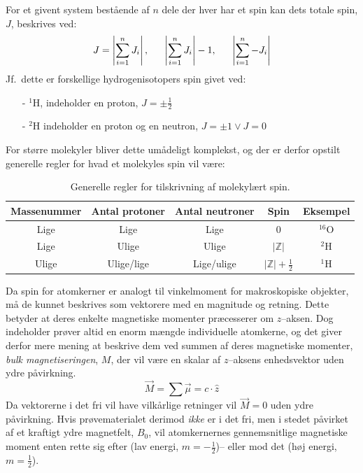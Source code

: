     For et givent system bestående af $n$ dele der hver har et spin kan dets totale spin, $J$, beskrives ved:
    \[
        J=\left|\sum_{i=1}^n J_i\right|, \hskip 16pt \left|\sum_{i=1}^n J_i\right|-1, \hskip 16pt \left|\sum_{i=1}^n -J_i\right|
    \]
    Jf.\ dette er forskellige hydrogenisotopers spin givet ved:
    \begin{itemize}
        \item[-] $^1$H, indeholder en proton, $J=\pm\frac{1}{2}$ 
        \item[-] $^2$H indeholder en proton og en neutron, $J=\pm 1 \vee J=0$ 
    \end{itemize}
    For større molekyler bliver dette umådeligt komplekst, og der er derfor opstilt generelle regler for hvad et molekyles spin vil være:
    \begin{table}[H]\centering
        \caption{Generelle regler for tilskrivning af molekylært spin.}
        \begin{tabular}{ccccc}
            \toprule
            Massenummer & Antal protoner & Antal neutroner & Spin & Eksempel \\
            \midrule
            Lige & Lige & Lige & $0$ & $^{16}$O \\
            Lige & Ulige & Ulige & $\left|\mathbb{Z}\right|$ & $^2$H \\
            Ulige & Ulige/lige & Lige/ulige &  $\left|\mathbb{Z}\right|+\frac{1}{2}$ & $^1$H \\
            \bottomrule
        \end{tabular}
    \end{table}
    Da spin for atomkerner er analogt til vinkelmoment for makroskopiske objekter, må de kunnet beskrives som vektorere med en magnitude og retning. Dette betyder at deres enkelte magnetiske momenter præcesserer om $z$--aksen. Dog indeholder prøver altid en enorm mængde individuelle atomkerne, og det giver derfor mere mening at beskrive dem ved summen af deres magnetiske momenter, \textit{bulk magnetiseringen}, $M$, der vil være en skalar af $z$--aksens enhedsvektor uden ydre påvirkning. 
    \[
        \overrightarrow{M}=\sum\overrightarrow{\mu}=c\cdot \hat{z}
    \]
    Da vektorerne i det fri vil have vilkårlige retninger vil $\overrightarrow{M}=0$ uden ydre påvirkning. Hvis prøvematerialet derimod \textit{ikke}  er i det fri, men i stedet påvirket af et kraftigt ydre magnetfelt, $B_0$, vil atomkernernes gennemsnitlige magnetiske moment enten rette sig efter (lav energi, $m=-\frac{1}{2}$)-- eller mod det (høj energi, $m=\frac{1}{2}$). 
